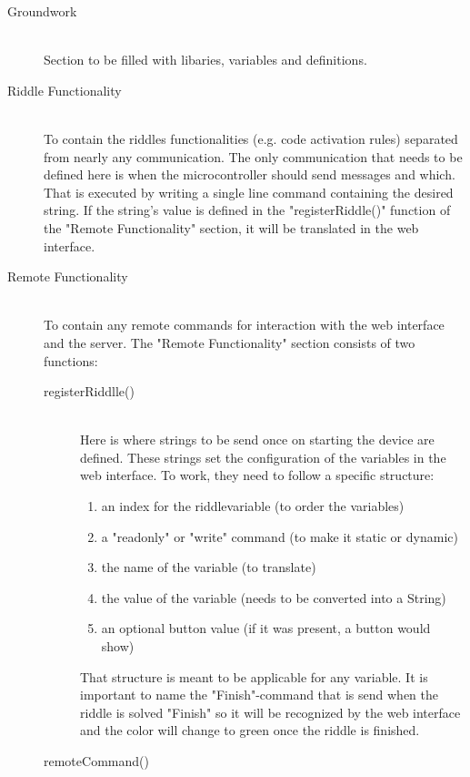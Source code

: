 \begin{description}
	\item [Groundwork]\hfill \\
	      Section to be filled with libaries, variables and definitions.
	\item [Riddle Functionality]\hfill \\
	      To contain the riddles functionalities (e.g. code activation rules) separated from nearly any communication.
	      The only communication that needs to be defined here is when the microcontroller should send messages and which.
	      That is executed by writing a single line command containing the desired string.
	      If the string's value is defined in the "registerRiddle()" function of the "Remote Functionality" section, it will be translated in the web interface.
	\item [Remote Functionality]\hfill \\
	      To contain any remote commands for interaction with the web interface and the server.
	      The "Remote Functionality" section consists of two functions:
	      \begin{description}
		      \item [registerRiddlle()]\hfill \\
		            Here is where strings to be send once on starting the device are defined.
		            These strings set the configuration of the variables in the web interface.
		            To work, they need to follow a specific structure:
		            \begin{enumerate}
			            \item an index for the riddlevariable (to order the variables)
			            \item a "readonly" or "write" command (to make it static or dynamic)
			            \item the name of the variable (to translate)
			            \item the value of the variable (needs to be converted into a String)
			            \item an optional button value (if it was present, a button would show)
		            \end{enumerate}
					That structure is meant to be applicable for any variable. 
					It is important to name the "Finish"-command that is send when the riddle is solved "Finish" so it will be recognized by the web interface and the color will change to green once the riddle is finished.
		      \item[remoteCommand()]\hfill \\

\end{description}
\end{description}
